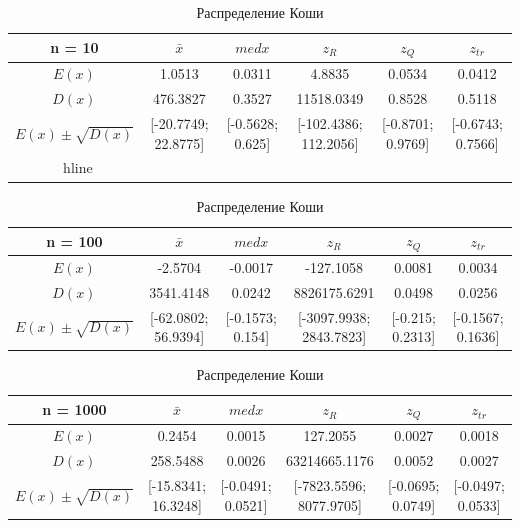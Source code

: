 \documentclass[12pt]{article}
\begin{document}
\begin{center}
\begin{table}[!hbt]
\end{table}
\begin{table}
\caption{Распределение Коши}
\begin{adjustbox}{width=\textwidth}
\begin{tabular}{| c | c | c | c | c | c |}
\hline
n = 10 & $\bar{x}$ & $med x$ & $z_R$ & $z_Q$ & $z_{tr}$ \\\hline
$E(x)$ & 1.0513 & 0.0311 & 4.8835 & 0.0534 & 0.0412 \\\hline
$D(x)$ & 476.3827 & 0.3527 & 11518.0349 & 0.8528 & 0.5118 \\\hline
$E(x) \pm \sqrt{D(x)}$ & [-20.7749; 22.8775] & [-0.5628; 0.625] & [-102.4386; 112.2056] & [-0.8701; 0.9769] & [-0.6743; 0.7566]\\\
hline
\end{tabular}
\end{adjustbox}

\begin{adjustbox}{width=\textwidth}
\begin{tabular}{| c | c | c | c | c | c |}
\hline
n = 100 & $\bar{x}$ & $med x$ & $z_R$ & $z_Q$ & $z_{tr}$ \\\hline
$E(x)$ & -2.5704 & -0.0017 & -127.1058 & 0.0081 & 0.0034 \\\hline
$D(x)$ & 3541.4148 & 0.0242 & 8826175.6291 & 0.0498 & 0.0256 \\\hline
$E(x) \pm \sqrt{D(x)}$ & [-62.0802; 56.9394] & [-0.1573; 0.154] & [-3097.9938; 2843.7823] & [-0.215; 0.2313] & [-0.1567; 0.1636]\\
\hline
\end{tabular}
\end{adjustbox}

\begin{adjustbox}{width=\textwidth}
\begin{tabular}{| c | c | c | c | c | c |}
\hline
n = 1000 & $\bar{x}$ & $med x$ & $z_R$ & $z_Q$ & $z_{tr}$ \\\hline
$E(x)$ & 0.2454 & 0.0015 & 127.2055 & 0.0027 & 0.0018 \\\hline
$D(x)$ & 258.5488 & 0.0026 & 63214665.1176 & 0.0052 & 0.0027 \\\hline
$E(x) \pm \sqrt{D(x)}$ & [-15.8341; 16.3248] & [-0.0491; 0.0521] & [-7823.5596; 8077.9705] & [-0.0695; 0.0749] & [-0.0497; 0.0533]
\\\hline
\end{tabular}
\end{adjustbox}

\end{table}


\end{center}
\end{document}
